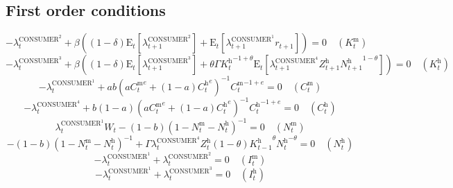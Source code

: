 \subsection{First order conditions}

\begin{equation}
-\lambda^{\mathrm{CONSUMER}^{\mathrm{2}}}_{t} + {\beta} \left(\left(1 - \delta\right) {\mathrm{E}_{t}\left[\lambda^{\mathrm{CONSUMER}^{\mathrm{2}}}_{t+1}\right]} + \mathrm{E}_{t}\left[{\lambda^{\mathrm{CONSUMER}^{\mathrm{1}}}_{t+1}} {r_{t+1}}\right]\right) = 0
 \quad \left(K^{\mathrm{m}}_{t}\right)
\end{equation}
\begin{equation}
-\lambda^{\mathrm{CONSUMER}^{\mathrm{3}}}_{t} + {\beta} \left(\left(1 - \delta\right) {\mathrm{E}_{t}\left[\lambda^{\mathrm{CONSUMER}^{\mathrm{3}}}_{t+1}\right]} + {\theta} {\Gamma} {{K^{\mathrm{h}}_{t}}^{-1 + \theta}} {\mathrm{E}_{t}\left[{\lambda^{\mathrm{CONSUMER}^{\mathrm{4}}}_{t+1}} {Z^{\mathrm{h}}_{t+1}} {{N^{\mathrm{h}}_{t+1}}^{1 - \theta}}\right]}\right) = 0
 \quad \left(K^{\mathrm{h}}_{t}\right)
\end{equation}
\begin{equation}
-\lambda^{\mathrm{CONSUMER}^{\mathrm{1}}}_{t} + {a} {b} \left({a} {{C^{\mathrm{m}}_{t}}^{e}} + \left(1 - a\right) {{C^{\mathrm{h}}_{t}}^{e}}\right)^{-1} {{C^{\mathrm{m}}_{t}}^{-1 + e}} = 0
 \quad \left(C^{\mathrm{m}}_{t}\right)
\end{equation}
\begin{equation}
-\lambda^{\mathrm{CONSUMER}^{\mathrm{4}}}_{t} + {b} \left(1 - a\right) \left({a} {{C^{\mathrm{m}}_{t}}^{e}} + \left(1 - a\right) {{C^{\mathrm{h}}_{t}}^{e}}\right)^{-1} {{C^{\mathrm{h}}_{t}}^{-1 + e}} = 0
 \quad \left(C^{\mathrm{h}}_{t}\right)
\end{equation}
\begin{equation}
{\lambda^{\mathrm{CONSUMER}^{\mathrm{1}}}_{t}} {W_{t}} - \left(1 - b\right) \left(1 - N^{\mathrm{m}}_{t} - N^{\mathrm{h}}_{t}\right)^{-1} = 0
 \quad \left(N^{\mathrm{m}}_{t}\right)
\end{equation}
\begin{equation}
-\left(1 - b\right) \left(1 - N^{\mathrm{m}}_{t} - N^{\mathrm{h}}_{t}\right)^{-1} + {\Gamma} {\lambda^{\mathrm{CONSUMER}^{\mathrm{4}}}_{t}} {Z^{\mathrm{h}}_{t}} \left(1 - \theta\right) {{K^{\mathrm{h}}_{t-1}}^{\theta}} {{N^{\mathrm{h}}_{t}}^{-\theta}} = 0
 \quad \left(N^{\mathrm{h}}_{t}\right)
\end{equation}
\begin{equation}
-\lambda^{\mathrm{CONSUMER}^{\mathrm{1}}}_{t} + \lambda^{\mathrm{CONSUMER}^{\mathrm{2}}}_{t} = 0
 \quad \left(I^{\mathrm{m}}_{t}\right)
\end{equation}
\begin{equation}
-\lambda^{\mathrm{CONSUMER}^{\mathrm{1}}}_{t} + \lambda^{\mathrm{CONSUMER}^{\mathrm{3}}}_{t} = 0
 \quad \left(I^{\mathrm{h}}_{t}\right)
\end{equation}





